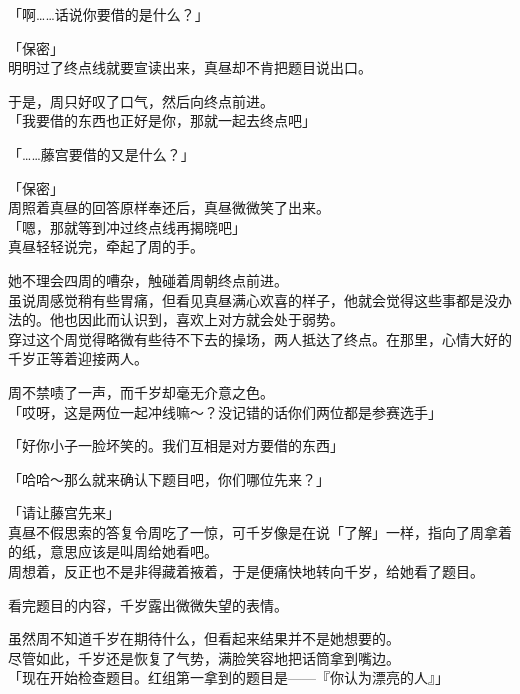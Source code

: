 「啊……话说你要借的是什么？」

「保密」\\

明明过了终点线就要宣读出来，真昼却不肯把题目说出口。

于是，周只好叹了口气，然后向终点前进。\\

「我要借的东西也正好是你，那就一起去终点吧」

「……藤宫要借的又是什么？」

「保密」\\

周照着真昼的回答原样奉还后，真昼微微笑了出来。\\

「嗯，那就等到冲过终点线再揭晓吧」\\

真昼轻轻说完，牵起了周的手。

她不理会四周的嘈杂，触碰着周朝终点前进。\\

虽说周感觉稍有些胃痛，但看见真昼满心欢喜的样子，他就会觉得这些事都是没办法的。他也因此而认识到，喜欢上对方就会处于弱势。\\

穿过这个周觉得略微有些待不下去的操场，两人抵达了终点。在那里，心情大好的千岁正等着迎接两人。

周不禁啧了一声，而千岁却毫无介意之色。\\

「哎呀，这是两位一起冲线嘛～？没记错的话你们两位都是参赛选手」

「好你小子一脸坏笑的。我们互相是对方要借的东西」

「哈哈～那么就来确认下题目吧，你们哪位先来？」

「请让藤宫先来」\\

真昼不假思索的答复令周吃了一惊，可千岁像是在说「了解」一样，指向了周拿着的纸，意思应该是叫周给她看吧。\\

周想着，反正也不是非得藏着掖着，于是便痛快地转向千岁，给她看了题目。

看完题目的内容，千岁露出微微失望的表情。

虽然周不知道千岁在期待什么，但看起来结果并不是她想要的。\\

尽管如此，千岁还是恢复了气势，满脸笑容地把话筒拿到嘴边。\\

「现在开始检查题目。红组第一拿到的题目是——『你认为漂亮的人』」\\

